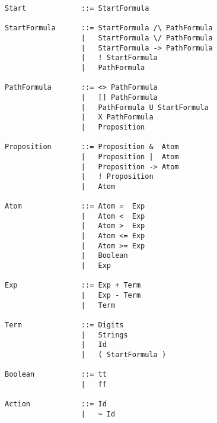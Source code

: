 \footnotesize
  \begin{verbatim}
Start             ::= StartFormula

StartFormula      ::= StartFormula /\ PathFormula
                  |   StartFormula \/ PathFormula
                  |   StartFormula -> PathFormula
                  |   ! StartFormula
                  |   PathFormula

PathFormula       ::= <> PathFormula
                  |   [] PathFormula
                  |   PathFormula U StartFormula
                  |   X PathFormula
                  |   Proposition

Proposition       ::= Proposition &  Atom
                  |   Proposition |  Atom
                  |   Proposition -> Atom
                  |   ! Proposition
                  |   Atom

Atom              ::= Atom =  Exp
                  |   Atom <  Exp
                  |   Atom >  Exp
                  |   Atom <= Exp
                  |   Atom >= Exp
                  |   Boolean
                  |   Exp

Exp               ::= Exp + Term
                  |   Exp - Term
                  |   Term

Term              ::= Digits
                  |   Strings
                  |   Id
                  |   ( StartFormula )

Boolean           ::= tt
                  |   ff

Action            ::= Id
                  |   ~ Id
  \end{verbatim}
